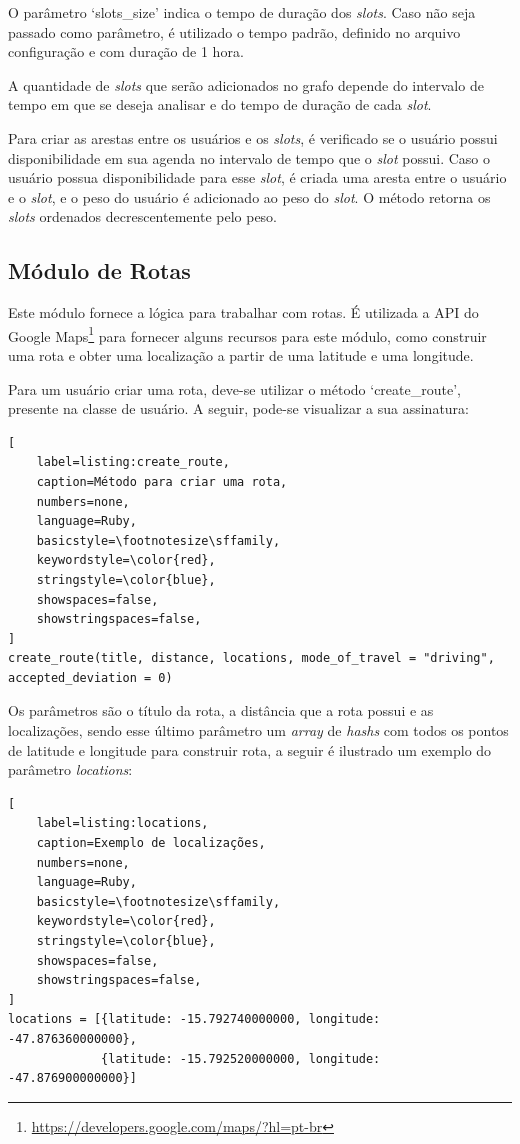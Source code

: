 O parâmetro `slots\_size' indica o tempo de duração dos \textit{slots}. Caso não seja passado como parâmetro, é utilizado o tempo padrão, definido no arquivo configuração e com duração de 1 hora.

A quantidade de \textit{slots} que serão adicionados no grafo depende do intervalo de tempo em que se deseja analisar e do tempo de duração de cada \textit{slot}.

Para criar as arestas entre os usuários e os \textit{slots}, é verificado se o usuário possui disponibilidade em sua agenda no intervalo de tempo que o \textit{slot} possui. Caso o usuário possua disponibilidade para esse \textit{slot}, é criada uma aresta entre o usuário e o \textit{slot}, e o peso do usuário é adicionado ao peso do \textit{slot}. O método retorna os \textit{slots} ordenados decrescentemente pelo peso.

\subsection{Módulo de Rotas}

Este módulo fornece a lógica para trabalhar com rotas. É utilizada a API do Google Maps\footnote{\url{https://developers.google.com/maps/?hl=pt-br}} para fornecer alguns recursos para este módulo, como construir uma rota e obter uma localização a partir de uma latitude e uma longitude.

Para um usuário criar uma rota, deve-se utilizar o método `create\_route', presente na classe de usuário. A seguir, pode-se visualizar a sua assinatura:

\begin{lstlisting}[
    label=listing:create_route,
    caption=Método para criar uma rota,
    numbers=none,
    language=Ruby,
    basicstyle=\footnotesize\sffamily,
    keywordstyle=\color{red},
    stringstyle=\color{blue},
    showspaces=false,
    showstringspaces=false,
]
create_route(title, distance, locations, mode_of_travel = "driving", accepted_deviation = 0)
\end{lstlisting}


Os parâmetros são o título da rota, a distância que a rota possui e as localizações, sendo esse último parâmetro um \textit{array} de \textit{hashs} com todos os pontos de latitude e longitude para construir rota, a seguir é ilustrado um exemplo do parâmetro \textit{locations}:

\begin{lstlisting}[
    label=listing:locations,
    caption=Exemplo de localizações,
    numbers=none,
    language=Ruby,
    basicstyle=\footnotesize\sffamily,
    keywordstyle=\color{red},
    stringstyle=\color{blue},
    showspaces=false,
    showstringspaces=false,
]
locations = [{latitude: -15.792740000000, longitude: -47.876360000000},
             {latitude: -15.792520000000, longitude: -47.876900000000}]
\end{lstlisting}


